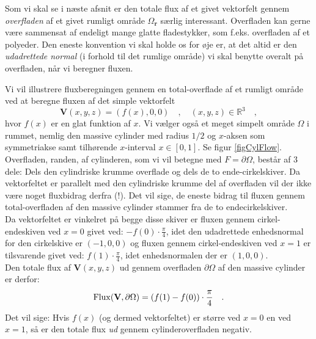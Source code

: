 Som vi skal se i næste afsnit er den totale flux af et givet vektorfelt gennem \emph{overfladen} af et givet rumligt område $\Omega_{\mathbf{r}}$ særlig interessant. Overfladen kan gerne være sammensat af endeligt mange glatte fladestykker, som f.eks. overfladen af et polyeder. Den eneste konvention vi skal holde os for øje er, at det altid er den \emph{udadrettede normal} (i forhold til det rumlige område) vi skal benytte overalt på overfladen, når vi beregner fluxen.


\begin{example} \label{exampCylFlow}
Vi vil illustrere fluxberegningen gennem en total-overflade af et rumligt område ved at beregne fluxen af det simple vektorfelt
\begin{equation}
\mathbf{V}(x,y,z)= (f(x), 0,0) \quad , \quad (x,y,z) \in \mathbb{R}^{3} \quad,
\end{equation}
hvor $f(x)$ er en glat funktion af $x$.
Vi vælger også et meget simpelt område $\Omega$ i rummet, nemlig den massive cylinder med radius $1/2$ og $x$-aksen som symmetriakse samt tilhørende $x$-interval $x \in [0, 1]$. Se figur \ref{figCylFlow}. \\

 Overfladen, randen, af cylinderen, som vi vil betegne med $F = \partial \Omega$, består af $3$ dele: Dels den cylindriske krumme overflade og dels
de to ende-cirkelskiver. Da vektorfeltet er parallelt med den cylindriske krumme del af overfladen vil der ikke være noget fluxbidrag derfra (!). Det vil sige, de eneste bidrag til fluxen gennem total-overfladen af den massive cylinder stammer fra de to endecirkelskiver.\\

Da vektorfeltet er vinkelret på begge disse skiver er fluxen gennem cirkel-endeskiven ved $x=0$ givet ved: $-f(0)\cdot \frac{\pi}{4}$, idet den udadrettede enhedsnormal for den cirkelskive er $(-1,0,0)$ og fluxen gennem cirkel-endeskiven ved $x=1$ er tilsvarende givet ved: $f(1)\cdot \frac{\pi}{4}$, idet enhedsnormalen der er $(1,0,0)$. \\

Den totale flux af $\mathbf{V}(x,y,z)$ ud gennem overfladen $\partial \Omega$ af den massive cylinder er derfor:
\begin{equation}
\operatorname{Flux}(\mathbf{V}, \partial \Omega) = (f(1) - f(0)) \cdot \frac{\pi}{4} \quad .
\end{equation}
Det vil sige: Hvis $f(x)$ (og dermed vektorfeltet) er større ved $x=0$  en ved $x=1$, så er den totale flux \emph{ud} gennem cylinderoverfladen negativ.
\end{example}

